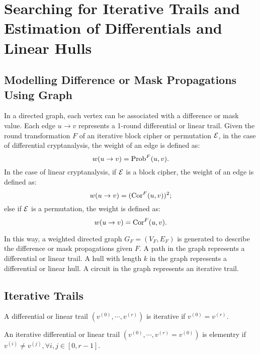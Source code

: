 \section{Searching for Iterative Trails and Estimation of Differentials and Linear Hulls\label{sec:method}}

\subsection{Modelling Difference or Mask Propagations Using Graph}

In a directed graph, each vertex can be associated with a difference or mask value. Each edge $u\rightarrow v$ represents a 1-round differential or linear trail. Given the round transformation $F$ of an iterative block cipher or permutation $\mathcal{E}$, in the case of differential cryptanalysis, the weight of an edge is defined as:
\[
    w(u\rightarrow v)=\text{Prob}^{F}(u,v).
\]
In the case of linear cryptanalysis, if $\mathcal{E}$ is a block cipher, the weight of an edge is defined as:
\[
    w(u\rightarrow v)=(\text{Cor}^{F}(u,v))^2;
\]
else if $\mathcal{E}$ is a permutation, the weight is defined as:
\[
    w(u\rightarrow v)=\text{Cor}^{F}(u,v).
\]

In this way, a weighted directed graph $G_{F}=(V_{F},E_{F})$ is generated to describe the difference or mask propagations given $F$. A path in the graph represents a differential or linear trail. A hull with length $k$ in the graph represents a differential or linear hull. A circuit in the graph represents an iterative trail. 

\subsection{Iterative Trails}

\begin{definition}
	A differential or linear trail $(v^{(0)},\cdots,v^{(r)})$ is iterative if $v^{(0)}=v^{(r)}$.
\end{definition}

\begin{definition}
    An iterative differential or linear trail $(v^{(0)},\cdots,v^{(r)}=v^{(0)})$ is elementry if $v^{(i)}\neq v^{(j)},\forall i,j\in [0,r-1]$.
\end{definition}

